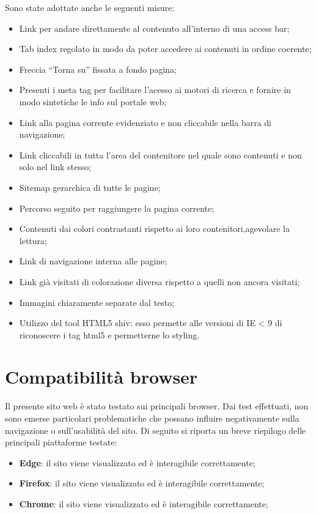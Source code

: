 Sono state adottate anche le seguenti misure:
\begin{itemize}
	\item Link per andare direttamente al contenuto all’interno di una access bar;
	\item Tab index regolato in modo da poter accedere ai contenuti in ordine coerente;
	\item Freccia “Torna su” fissata a fondo pagina;
	\item Presenti i meta tag per facilitare l’acesso ai motori di ricerca e fornire in modo sintetiche le info sul portale web;
	\item Link alla pagina corrente evidenziato e non cliccabile nella barra di navigazione;
	\item Link cliccabili in tutta l’area del contenitore nel quale sono contenuti e non solo nel link stesso;
	\item Sitemap gerarchica di tutte le pagine;
	\item Percorso seguito per raggiungere la pagina corrente;
	\item Contenuti dai colori contrastanti rispetto ai loro contenitori,agevolare la lettura;
	\item Link di navigazione interna alle pagine;
	\item Link già visitati di colorazione diversa rispetto a quelli non ancora visitati;
	\item Immagini chiaramente separate dal testo;
	\item Utilizzo del tool HTML5 shiv: esso permette alle versioni di IE < 9 di riconoscere i tag html5 e permetterne lo styling.
\end{itemize}


\section{Compatibilità browser}

Il presente sito web è stato testato sui principali browser. Dai test effettuati, non sono emerse particolari problematiche che possano influire negativamente sulla navigazione o sull'usabilità del sito.
Di seguito si riporta un breve riepilogo delle principali piattaforme testate:
	\begin{itemize}
		\item \textbf{Edge}: il sito viene visualizzato ed è interagibile correttamente;
		\item \textbf{Firefox}: il sito viene visualizzato ed è interagibile correttamente;
		\item \textbf{Chrome}: il sito viene visualizzato ed è interagibile correttamente;
	\end{itemize}

